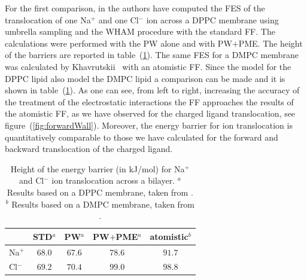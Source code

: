 For the first comparison, in \cite{PW} the authors have computed the \ac{FES} of the translocation of one Na$^+$ and one Cl$^-$ ion across a \acs{DPPC} membrane using umbrella sampling and the \ac{WHAM} procedure with the standard \martini \ac{FF}. The calculations were performed with the \ac{PW} alone and with \ac{PW}$+$\ac{PME}. The height of the barriers are reported in table~(\ref{tab:ionTranslocation}). The same \ac{FES} for a \acs{DMPC} membrane was calculated by Khavrutskii \etal\, \cite{atomisticTranslocation} with an atomistic \ac{FF}. Since the \martini model for the \acs{DPPC} lipid also model the \acs{DMPC} lipid a comparison can be made and it is shown in table~(\ref{tab:ionTranslocation}). As one can see, from left to right, increasing the accuracy of the treatment of the electrostatic interactions the \martini \ac{FF} approaches the results of the atomistic \ac{FF}, as we have observed for the charged ligand translocation, see figure~(\ref{fig:forwardWall}). Moreover, the energy barrier for ion translocation is quantitatively comparable to those we have calculated for the forward and backward translocation of the charged ligand.
\begin{table}[h!t]
	\centering
	\begin{tabular}{lcccc}
		\toprule	
		\,		& STD$^a$ 	& \acs{PW}$^a$ 	& \acs{PW}$+$\acs{PME}$^a$ 	& atomistic$^b$	\\ \toprule
		Na$^+$	& $68.0$& $67.6$	& $78.6$	& $91.7$ 	\\ \midrule
		Cl$^-$	& $69.2$& $70.4$	& $99.0$	& $98.8$	\\ \bottomrule
	\end{tabular}
	\caption{Height of the energy barrier (in kJ/mol) for Na$^+$ and Cl$^-$ ion translocation across a bilayer. $^a$ Results based on a \acs{DPPC} membrane, taken from \cite{PW}. $^b$ Results based on a \acs{DMPC} membrane, taken from \cite{atomisticTranslocation}.}%
	\label{tab:ionTranslocation}
\end{table}

